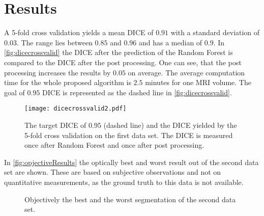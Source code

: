 \section{Results}
A 5-fold cross validation yields a mean DICE of $0.91$ with a standard deviation of $0.03$. The range lies between $0.85$ and $0.96$ and has a median of $0.9$. In \autoref{fig:dicecrossvalid} the DICE after the prediction of the Random Forest is compared to the DICE after the post processing. One can see, that the post processing increases the results by $0.05$ on average. The average computation time for the whole proposed algorithm is $2.5$ minutes for one MRI volume. The goal of $0.95$ DICE is represented as the dashed line in \autoref{fig:dicecrossvalid}.
\begin{figure}[h]
\centering
\texttt{[image: dicecrossvalid2.pdf]}
\caption{The target DICE of $0.95$ (dashed line) and the DICE yielded by the 5-fold cross validation on the first data set. The DICE is measured once after Random Forest and once after post processing.}
\label{fig:dicecrossvalid}
\end{figure}

In \autoref{fig:opjectiveResults} the optically best and worst result out of the second data set are shown. These are based on subjective observations and not on quantitative measurements, as the ground truth to this data is not available.
\begin{figure*}[!t]
	\centering
	\hfil
	
	\caption{Objectively the best and the worst segmentation of the second data set.}
	\label{fig:opjectiveResults}
\end{figure*}
